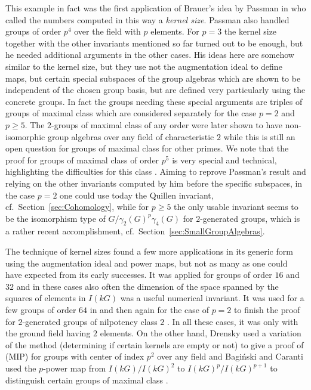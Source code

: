 \documentclass[11pt, a4paper]{amsart}
\theoremstyle{definition}
\begin{document}
This example in fact was the first application of Brauer's idea by Passman in \cite{Passmanp4} who called the numbers computed in this way a \emph{kernel size}. Passman also handled groups of order $p^4$ over the field with $p$ elements. For $p=3$ the kernel size together with the other invariants mentioned so far turned out to be enough, but he needed additional arguments in the other cases. His ideas here are somehow similar to the kernel size, but they use not the augmentation ideal to define maps, but certain special subspaces of the group algebras which are shown to be independent of the chosen group basis, but are defined very particularly using the concrete groups. In fact the groups needing these special arguments are triples of groups of maximal class which are considered separately for the case $p=2$ and $p \geq 5$. The $2$-groups of maximal class of any order were later shown to have non-isomorphic group algebras over any field of characteristic $2$ \cite{Carlson77, Baginski92} while this is still an open question for groups of maximal class for other primes. We note that the proof for groups of maximal class of order $p^5$ is very special and technical, highlighting the difficulties for this class \cite{SalimSandlingMaximal}. Aiming to reprove Passman's result and relying on the other invariants computed by him before the specific subspaces, in the case $p=2$ one could use today the Quillen invariant, cf.\ Section~\ref{sec:Cohomology}, while for $p \geq 5$ the only usable invariant seems to be the isomorphism type of $G/\gamma_2(G)^p\gamma_4(G)$ for $2$-generated groups, which is a rather recent accomplishment, cf.\ Section~\ref{sec:SmallGroupAlgebras}.

The technique of kernel sizes found a few more applications in its generic form using the augmentation ideal and power maps, but not as many as one could have expected from its early successes. It was applied for groups of order $16$ and $32$ \cite{Holvoet68, Holvoet69, Makasikis} and in these cases also often the dimension of the space spanned by the squares of elements in $I(kG)$ was a useful numerical invariant. It was used for a few groups of order $64$ in \cite{HertweckSoriano06} and then again for the case of $p=2$ to finish the proof for $2$-generated groups of nilpotency class $2$ \cite{BrochedelRio21}. In all these cases, it was only with the ground field having $2$ elements. On the other hand, Drensky used a variation of the method (determining if certain kernels are empty or not) to give a proof of (MIP) for groups with center of index $p^2$ over any field \cite{Drensky89} and Bagi\'nski and Caranti used the $p$-power map from $I(kG)/I(kG)^2$ to $I(kG)^p/I(kG)^{p+1}$ to distinguish certain groups of maximal class \cite{BaginskiCaranti88}.
\end{document}
